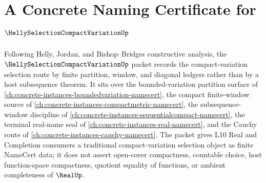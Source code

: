 \chapter{A Concrete Naming Certificate for $\HellySelectionCompactVariationUp$}
\label{ch:concrete-instances-helly-selection-compact-variation-namecert}

Following Helly, Jordan, and Bishop--Bridges constructive analysis, the $\HellySelectionCompactVariationUp$ packet records the compact-variation selection route by finite partition, window, and diagonal ledgers rather than by a host subsequence theorem. It sits over the bounded-variation partition surface of \autoref{ch:concrete-instances-boundedvariation-namecert}, the compact finite-window source of \autoref{ch:concrete-instances-compactmetric-namecert}, the subsequence-window discipline of \autoref{ch:concrete-instances-sequentialcompact-namecert}, the terminal real-name seal of \autoref{ch:concrete-instances-real-namecert}, and the Cauchy route of \autoref{ch:concrete-instances-cauchy-namecert}. The packet gives L10 Real and Completion consumers a traditional compact-variation selection object as finite NameCert data; it does not assert open-cover compactness, countable choice, host function-space compactness, quotient equality of functions, or ambient completeness of $\RealUp$.

